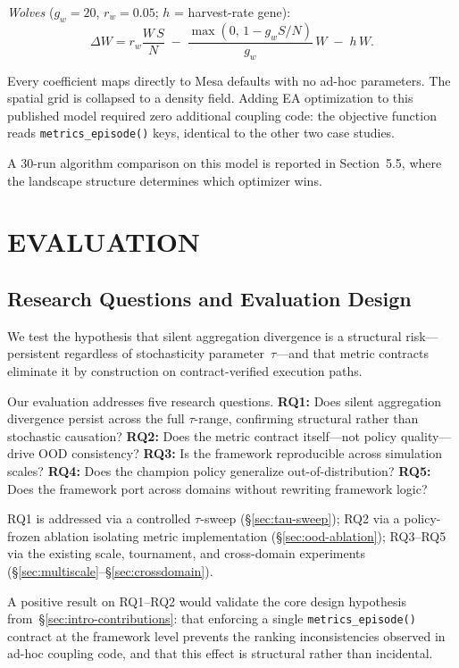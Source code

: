 \documentclass{wscpaperproc}
\begin{document}
\textit{Wolves} ($g_w\!=\!20$, $r_w\!=\!0.05$; $h$ = harvest-rate gene):
\begin{equation}
  \Delta W = r_w \frac{W\,S}{N}
             \;-\; \frac{\max(0,\,1-g_w S/N)}{g_w}\,W
             \;-\; h\,W.
  \label{eq:wolf}
\end{equation}

Every coefficient maps directly to Mesa defaults with no ad-hoc parameters. The
spatial grid is collapsed to a density field. Adding EA optimization to this
published model required zero additional coupling code: the objective function
reads \texttt{metrics\_episode()} keys, identical to the other two case studies.

A 30-run algorithm comparison on this model is reported in Section~5.5,
where the landscape structure determines which optimizer wins.

\section{EVALUATION}

\subsection{Research Questions and Evaluation Design}

We test the hypothesis that silent aggregation divergence is a structural
risk---persistent regardless of stochasticity parameter~$\tau$---and that metric
contracts eliminate it by construction on contract-verified execution paths.

Our evaluation addresses five research questions.
\textbf{RQ1:} Does silent aggregation divergence persist across the full
$\tau$-range, confirming structural rather than stochastic causation?
\textbf{RQ2:} Does the metric contract itself---not policy quality---drive OOD
consistency?
\textbf{RQ3:} Is the framework reproducible across simulation scales?
\textbf{RQ4:} Does the champion policy generalize out-of-distribution?
\textbf{RQ5:} Does the framework port across domains without rewriting
framework logic?

RQ1 is addressed via a controlled $\tau$-sweep (\S\ref{sec:tau-sweep});
RQ2 via a policy-frozen ablation isolating metric implementation
(\S\ref{sec:ood-ablation}); RQ3--RQ5 via the existing scale, tournament,
and cross-domain experiments (\S\ref{sec:multiscale}--\S\ref{sec:crossdomain}).

A positive result on RQ1--RQ2 would validate the core design hypothesis
from~\S\ref{sec:intro-contributions}: that enforcing a single
\texttt{metrics\_episode()} contract at the framework level prevents the
ranking inconsistencies observed in ad-hoc coupling code, and that this effect
is structural rather than incidental.
\end{document}
